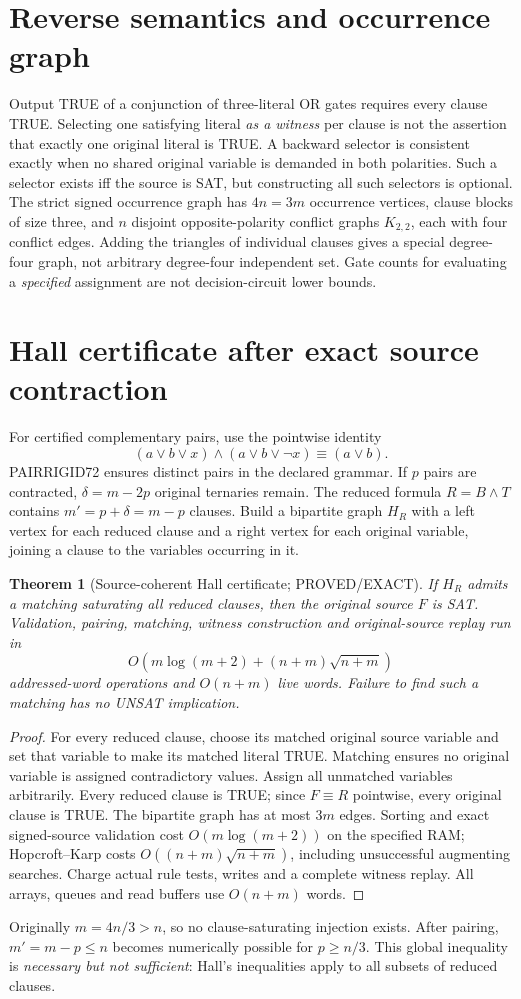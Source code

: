 \documentclass[11pt]{article}
\newtheorem{theorem}{Theorem}
\begin{document}
\section{Reverse semantics and occurrence graph}
Output TRUE of a conjunction of three-literal OR gates requires every clause TRUE. Selecting one satisfying literal \emph{as a witness} per clause is not the assertion that exactly one original literal is TRUE. A backward selector is consistent exactly when no shared original variable is demanded in both polarities. Such a selector exists iff the source is SAT, but constructing all such selectors is optional.
The strict signed occurrence graph has $4n=3m$ occurrence vertices, clause blocks of size three, and $n$ disjoint opposite-polarity conflict graphs $K_{2,2}$, each with four conflict edges. Adding the triangles of individual clauses gives a special degree-four graph, not arbitrary degree-four independent set. Gate counts for evaluating a \emph{specified} assignment are not decision-circuit lower bounds.
\section{Hall certificate after exact source contraction}
For certified complementary pairs, use the pointwise identity
\[
(a\vee b\vee x)\wedge(a\vee b\vee\neg x)\equiv(a\vee b).
\]
PAIRRIGID72 ensures distinct pairs in the declared grammar. If $p$ pairs are contracted, $\delta=m-2p$ original ternaries remain. The reduced formula $R=B\wedge T$ contains $m'=p+\delta=m-p$ clauses. Build a bipartite graph $H_R$ with a left vertex for each reduced clause and a right vertex for each original variable, joining a clause to the variables occurring in it.
\begin{theorem}[Source-coherent Hall certificate; PROVED/EXACT]
If $H_R$ admits a matching saturating all reduced clauses, then the original source $F$ is SAT. Validation, pairing, matching, witness construction and original-source replay run in
\[
O(m\log(m+2)+(n+m)\sqrt{n+m})
\]
addressed-word operations and $O(n+m)$ live words. Failure to find such a matching has \emph{no} UNSAT implication.
\end{theorem}
\begin{proof}
For every reduced clause, choose its matched original source variable and set that variable to make its matched literal TRUE. Matching ensures no original variable is assigned contradictory values. Assign all unmatched variables arbitrarily. Every reduced clause is TRUE; since $F\equiv R$ pointwise, every original clause is TRUE. The bipartite graph has at most $3m$ edges. Sorting and exact signed-source validation cost $O(m\log(m+2))$ on the specified RAM; Hopcroft--Karp costs $O((n+m)\sqrt{n+m})$, including unsuccessful augmenting searches. Charge actual rule tests, writes and a complete witness replay. All arrays, queues and read buffers use $O(n+m)$ words.
\end{proof}
Originally $m=4n/3>n$, so no clause-saturating injection exists. After pairing, $m'=m-p\le n$ becomes numerically possible for $p\ge n/3$. This global inequality is \emph{necessary but not sufficient}: Hall's inequalities apply to all subsets of reduced clauses.
\end{document}
